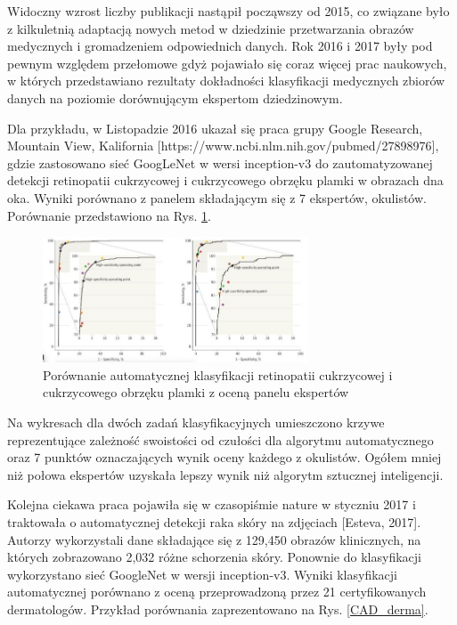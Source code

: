  Widoczny wzrost liczby publikacji nastąpił począwszy od 2015, co związane było z kilkuletnią adaptacją nowych metod w dziedzinie przetwarzania obrazów medycznych i gromadzeniem odpowiednich danych. Rok 2016 i 2017 były pod pewnym względem przełomowe gdyż pojawiało się coraz więcej prac naukowych, w których przedstawiano rezultaty dokładności klasyfikacji medycznych zbiorów danych na poziomie dorównującym ekspertom dziedzinowym.
 
 Dla przykładu, w Listopadzie 2016 ukazał się praca grupy Google Research, Mountain View, Kalifornia [https://www.ncbi.nlm.nih.gov/pubmed/27898976], gdzie zastosowano sieć GoogLeNet w wersi inception-v3 do zautomatyzowanej detekcji retinopatii cukrzycowej i cukrzycowego obrzęku plamki w obrazach dna oka. Wyniki porównano z panelem składającym się z 7 ekspertów, okulistów. Porównanie przedstawiono na Rys. \ref{CAD_opto}.
 \begin{figure}[h!]
 	\centering
 	\includegraphics[width=0.7\textwidth]{figures/CAD-okulisci.jpg}
 	\caption{Porównanie automatycznej klasyfikacji retinopatii cukrzycowej i cukrzycowego obrzęku plamki z oceną panelu ekspertów}
 	\label{CAD_opto}
 \end{figure}
 
 Na wykresach dla dwóch zadań klasyfikacyjnych umieszczono krzywe reprezentujące zależność swoistości od czułości dla algorytmu automatycznego oraz 7 punktów oznaczających wynik oceny każdego z okulistów. Ogółem mniej niż połowa ekspertów uzyskała lepszy wynik niż algorytm sztucznej inteligencji.
 
 Kolejna ciekawa praca pojawiła się w czasopiśmie nature w styczniu 2017 i traktowała o automatycznej detekcji raka skóry na zdjęciach [Esteva, 2017]. Autorzy wykorzystali dane składające się z 129,450 obrazów klinicznych, na których zobrazowano 2,032 różne schorzenia skóry. Ponownie do klasyfikacji wykorzystano sieć GoogleNet w wersji inception-v3. Wyniki klasyfikacji automatycznej porównano z oceną przeprowadzoną przez 21 certyfikowanych dermatologów. Przykład porównania zaprezentowano na Rys. \ref{CAD_derma}. 
 
